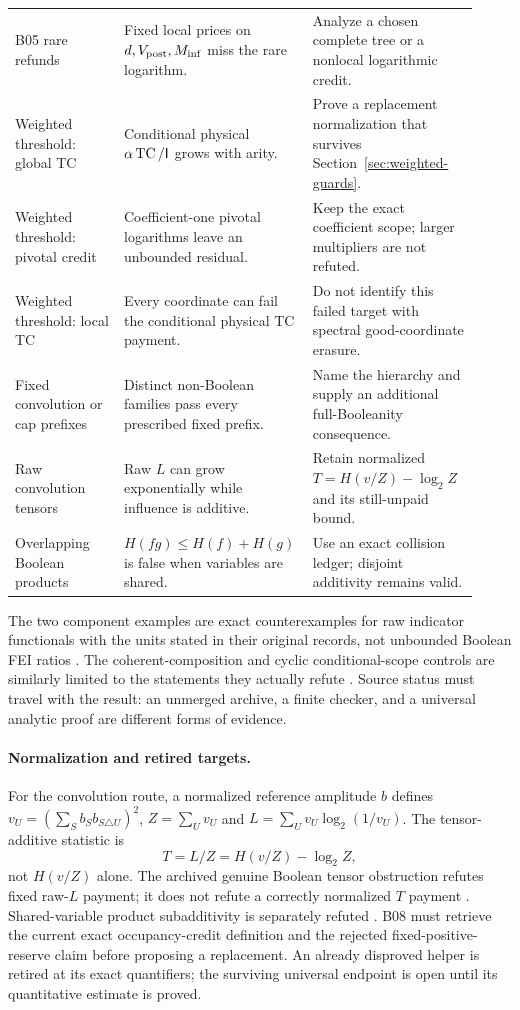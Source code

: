 \documentclass[11pt]{article}
\begin{document}
\begin{longtable}{>{\raggedright\arraybackslash}p{0.23\linewidth}>{\raggedright\arraybackslash}p{0.34\linewidth}>{\raggedright\arraybackslash}p{0.35\linewidth}}
B05 rare refunds & Fixed local prices on $d,V_{\rm post},M_{\rm inf}$ miss the rare logarithm. & Analyze a chosen complete tree or a nonlocal logarithmic credit. \\
Weighted threshold: global TC & Conditional physical $\alpha\operatorname{TC}/\mathsf I$ grows with arity. & Prove a replacement normalization that survives Section~\ref{sec:weighted-guards}. \\
Weighted threshold: pivotal credit & Coefficient-one pivotal logarithms leave an unbounded residual. & Keep the exact coefficient scope; larger multipliers are not refuted. \\
Weighted threshold: local TC & Every coordinate can fail the conditional physical TC payment. & Do not identify this failed target with spectral good-coordinate erasure. \\
Fixed convolution or cap prefixes & Distinct non-Boolean families pass every prescribed fixed prefix. & Name the hierarchy and supply an additional full-Booleanity consequence. \\
Raw convolution tensors & Raw $L$ can grow exponentially while influence is additive. & Retain normalized $T=H(v/Z)-\log_2Z$ and its still-unpaid bound. \\
Overlapping Boolean products & $H(fg)\le H(f)+H(g)$ is false when variables are shared. & Use an exact collision ledger; disjoint additivity remains valid. \\

\bottomrule
\end{longtable}

The two component examples are exact counterexamples for raw indicator functionals with the units stated in their original records, not unbounded Boolean FEI ratios \cite{Brain44,Brain45}. The coherent-composition and cyclic conditional-scope controls are similarly limited to the statements they actually refute \cite{Brain54}. Source status must travel with the result: an unmerged archive, a finite checker, and a universal analytic proof are different forms of evidence.


\paragraph{Normalization and retired targets.}
For the convolution route, a normalized reference amplitude $b$
defines $v_U=(\sum_S b_S b_{S\triangle U})^2$,
$Z=\sum_Uv_U$ and $L=\sum_Uv_U\log_2(1/v_U)$.
The tensor-additive statistic is
\[
 T=L/Z=H(v/Z)-\log_2 Z,
\]
not $H(v/Z)$ alone. The archived genuine Boolean tensor
obstruction refutes fixed raw-$L$ payment; it does not refute a
correctly normalized $T$ payment \cite{BrainNormalized}.
Shared-variable product subadditivity is separately refuted
\cite{BrainOverlap}. B08 must retrieve the current exact
occupancy-credit definition and the rejected fixed-positive-reserve
claim before proposing a replacement. An already disproved
helper is retired at its exact quantifiers; the surviving
universal endpoint is open until its quantitative estimate is proved.
\end{document}
